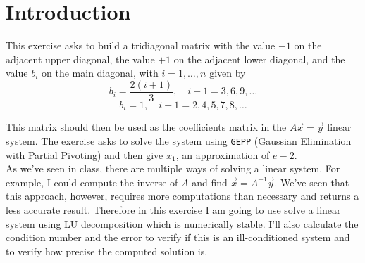 \documentclass{article}
\newcommand{\code}{\texttt}
\begin{document}

\section{Introduction}\label{sec:intro}
This exercise asks to build a tridiagonal matrix with the value $-1$ on the adjacent upper diagonal, the value $+1$ on the adjacent lower diagonal, and the value $b_{i}$ on the main diagonal, with $i = 1, \ldots, n$ given by
$$b_i =\frac{2(i+1)}{3},\quad i + 1= 3, 6, 9,\ldots$$
$$b_i =1,\quad i + 1 = 2, 4, 5, 7, 8, \ldots$$

This matrix should then be used as the coefficients matrix in the $A\vec{x}=\vec{y}$ linear system. The exercise asks to solve the system using \code{GEPP} (Gaussian Elimination with Partial Pivoting) and then give $x_1$, an approximation of $e-2$.\\

As we've seen in class, there are multiple ways of solving a linear system. For example, I could compute the inverse of $A$ and find $\vec{x}=A^{-1}\vec{y}$. We've seen that this approach, however, requires more computations than necessary and returns a less accurate result. Therefore in this exercise I am going to use solve a linear system using LU decomposition which is numerically stable. I'll also calculate the condition number and the error to verify if this is an ill-conditioned system and to verify how precise the computed solution is.
\end{document}

